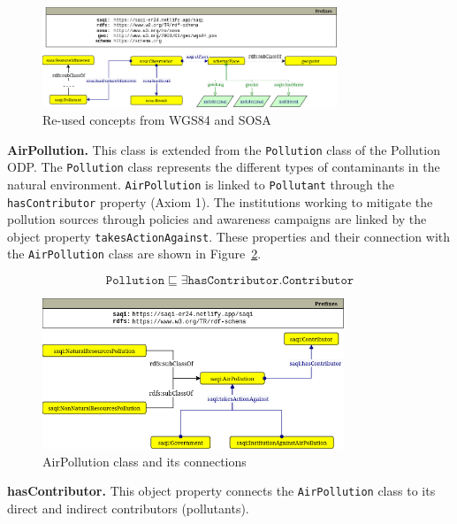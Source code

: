 \begin{figure}[ht]
\centering
\includegraphics[height=3cm]{figures/reuse_new.png}
\caption{Re-used concepts from WGS84 and SOSA} 
\label{fig:reused-concepts-wgs84-sosa}
\end{figure}


\textbf{AirPollution.} This class is extended from the \texttt{Pollution} class of the Pollution ODP. The \texttt{Pollution} class represents the different types of contaminants in the natural environment. \texttt{AirPollution} is linked to \texttt{Pollutant} through the  \texttt{hasContributor} property (Axiom 1). The institutions working to mitigate the pollution sources through policies and awareness campaigns are linked by the object property \texttt{takesActionAgainst}. These properties and their connection with the \texttt{AirPollution} class are shown in Figure~\ref{fig:air_pollution_concepts}.

\begin{equation}
    \texttt{Pollution} \sqsubseteq \exists\texttt{hasContributor}.\texttt{Contributor}    
\end{equation}

\begin{figure}[ht]
\centering
\includegraphics[height=4.5cm]{figures/airpoll_new.png}
\caption{AirPollution class and its connections} 
\label{fig:air_pollution_concepts}
\end{figure}

\textbf{hasContributor.} This object property connects the \texttt{AirPollution} class to its direct and indirect contributors (pollutants). %

